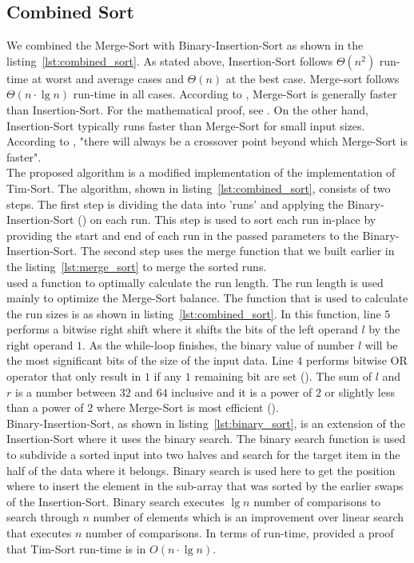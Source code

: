 \documentclass[sigconf, nonacm, natbib, screen, balance=False]{acmart}
\begin{document}
\subsection{Combined Sort}
We combined the Merge-Sort with Binary-Insertion-Sort as shown in the listing~\ref{lst:combined_sort}. As stated above, Insertion-Sort follows $\Theta (n^2)$ run-time at worst and average cases and $\Theta (n)$ at the best case. Merge-sort follows $\Theta (n \cdot \lg n)$ run-time in all cases. According to \citet{CLRS_2009}, Merge-Sort is generally faster than Insertion-Sort. For the mathematical proof, see \citet[Ch.~2.3]{CLRS_2009}. On the other hand, Insertion-Sort typically runs faster than Merge-Sort for small input sizes. According to \citet{CLRS_2009}, "there will always be a crossover point beyond which Merge-Sort is faster".
\hfill\\
The proposed algorithm is a modified implementation of the \citet{cpythonsourcecode} implementation of Tim-Sort. The algorithm, shown in listing~\ref{lst:combined_sort}, consists of two steps. The first step is dividing the data into 'runs' and applying the Binary-Insertion-Sort (\citet{DBLP:conf/soda/McIlroy93}) on each run. This step is used to sort each run in-place by providing the start and end of each run in the passed parameters to the Binary-Insertion-Sort. The second step uses the merge function that we built earlier in the listing~\ref{lst:merge_sort} to merge the sorted runs. 
\hfill\\
\citet{cpythonsourcecode} used a function to optimally calculate the run length. The run length is used mainly to optimize the Merge-Sort balance. The function that is used to calculate the run sizes is as shown in listing~\ref{lst:combined_sort}. In this function, line $5$ performs a bitwise right shift where it shifts the bits of the left operand $l$ by the right operand $1$. As the while-loop finishes, the binary value of number $l$ will be the most significant bits of the size of the input data. Line $4$ performs bitwise OR operator that only result in $1$ if any $1$ remaining bit are set (\citet{cpythonsourcecode}). The sum of $l$ and $r$ is a number between $32$ and $64$ inclusive and it is a power of $2$ or slightly less than a power of $2$ where Merge-Sort is most efficient (\citet{wiki:timsort-wiki}).
\hfill\\
Binary-Insertion-Sort, as shown in listing~\ref{lst:binary_sort}, is an extension of the Insertion-Sort where it uses the binary search. The binary search function is used to subdivide a sorted input into two halves and search for the target item in the half of the data where it belongs. Binary search is used here to get the position where to insert the element in the sub-array that was sorted by the earlier swaps of the Insertion-Sort. Binary search executes $\lg n$ number of comparisons to search through $n$ number of elements which is an improvement over linear search that executes $n$ number of comparisons. In terms of run-time, \citet{NicolasAuger} provided a proof that Tim-Sort run-time is in $O(n \cdot \lg n)$.  
\end{document}
